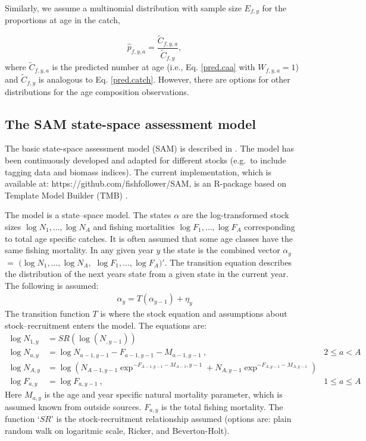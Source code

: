 \documentclass[12pt,letterpaper, leqno]{article}
\begin{document}
Similarly, we assume a multinomial distribution with sample size $E_{f,y}$ for the proportions at age in the catch,

\vspace{-12pt}
\begin{equation*}
  \widehat p_{f,y,a} = \frac{\widetilde C_{f,y,a}}{\widetilde C_{f,y}},
\end{equation*}
where $\widetilde C_{f,y,a}$ is the predicted number at age (i.e., Eq. \ref{pred.caa} with $W_{f,y,a} = 1$) and $\widetilde C_{f,y}$ is analogous to Eq. \ref{pred.catch}. However, there are options for other distributions for the age composition observations.

\subsection*{The SAM state-space assessment model}

The basic state-space assessment model (SAM) is described in \citet{nielsen2014estimation}. The model has been continuously developed and adapted for different stocks (e.g.~to include tagging data and biomass indices). The current implementation, which is available at: https://github.com/fishfollower/SAM, is an R-package based on Template Model Builder (TMB) \citep{kristensenetal16}.

The model is a state--space model. The states $\alpha$ are the log-transformed stock sizes $\log{N_1},\ldots,\log{N_A}$ and fishing mortalities $\log{F_1},\ldots,\log{F_{A}}$ corresponding to total age specific catches. It is often assumed that some age classes have the same fishing mortality. In any given year $y$ the state is the combined vector $\alpha_y$ $=$ $(\log{N_1},\ldots,\log{N_A},$ $ \log{F_1},\ldots,\log{F_{A}})'$. The transition equation describes the distribution of the next years state from a given state in the current year. The following is assumed: 
 \begin{align*}
 \alpha_{y}=T(\alpha_{y-1})+\eta_y
 \end{align*}  
 The transition function $T$ is where the stock equation and assumptions about stock--recruitment enters the model. The equations are:   
 \begin{align*}
 \log N_{1,y}&=SR(\log(N_{,y-1}))&\\
 \log N_{a,y}&=\log N_{a-1,y-1} - F_{a-1,y-1} - M_{a-1,y-1}\ , \quad &2\leq a < A \\
 \log N_{A,y}&=\log( N_{A-1,y-1}\exp^{- F_{A-1,y-1} - M_{A-1},y-1} + N_{A,y-1}\exp^{- F_{A,y-1} - M_{A,y-1}})&\\
 \log F_{a,y}&=\log F_{a,y-1}\ , \quad &1\leq a \leq A 
 \end{align*}  
Here $M_{a,y}$ is the age and year specific natural mortality parameter, which is assumed known from outside sources. $F_{a,y}$ is the total fishing mortality. The function `$SR$' is the stock-recruitment relationship assumed (options are: plain random walk on logaritmic scale, Ricker, and Beverton-Holt). 
\end{document}
